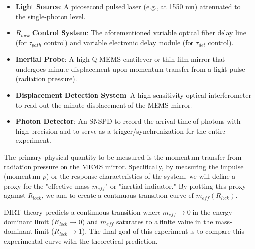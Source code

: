 \documentclass[a4paper,12pt]{article}
\begin{document}
\begin{itemize}
    \item \textbf{Light Source}: A picosecond pulsed laser (e.g., at 1550 nm) attenuated to the single-photon level.
    \item \textbf{$R_{lock}$ Control System}: The aforementioned variable optical fiber delay line (for $\tau_{path}$ control) and variable electronic delay module (for $\tau_{det}$ control).
    \item \textbf{Inertial Probe}: A high-Q MEMS cantilever or thin-film mirror that undergoes minute displacement upon momentum transfer from a light pulse (radiation pressure).
    \item \textbf{Displacement Detection System}: A high-sensitivity optical interferometer to read out the minute displacement of the MEMS mirror.
    \item \textbf{Photon Detector}: An SNSPD to record the arrival time of photons with high precision and to serve as a trigger/synchronization for the entire experiment.
\end{itemize}

The primary physical quantity to be measured is the momentum transfer from radiation pressure on the MEMS mirror. Specifically, by measuring the impulse (momentum $p$) or the response characteristics of the system, we will define a proxy for the "effective mass $m_{eff}$" or "inertial indicator." By plotting this proxy against $R_{lock}$, we aim to create a continuous transition curve of $m_{eff}(R_{lock})$.

DIRT theory predicts a continuous transition where $m_{eff} \to 0$ in the energy-dominant limit ($R_{lock} \to 0$) and $m_{eff}$ saturates to a finite value in the mass-dominant limit ($R_{lock} \to 1$). The final goal of this experiment is to compare this experimental curve with the theoretical prediction.
\end{document}
